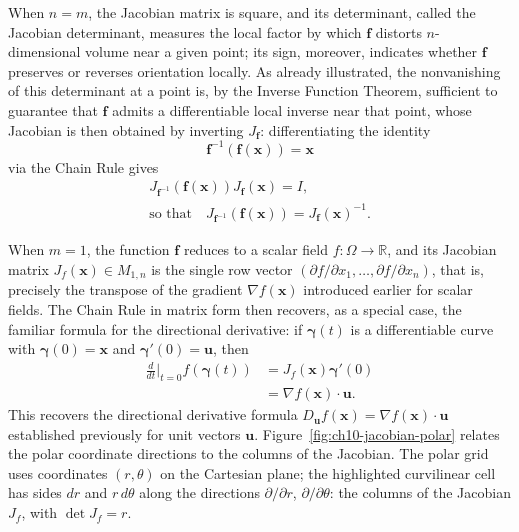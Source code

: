 When $n=m$, the Jacobian matrix is square, and its determinant, called the Jacobian determinant, measures the local factor by which $\mathbf{f}$ distorts $n$-dimensional volume near a given point; its sign, moreover, indicates whether $\mathbf{f}$ preserves or reverses orientation locally. As already illustrated, the nonvanishing of this determinant at a point is, by the Inverse Function Theorem, sufficient to guarantee that $\mathbf{f}$ admits a differentiable local inverse near that point, whose Jacobian is then obtained by inverting $J_{\mathbf{f}}$: differentiating the identity
\[
\mathbf{f}^{-1}(\mathbf{f}(\mathbf{x})) = \mathbf{x}
\]
via the Chain Rule gives
\[
\begin{gathered}
J_{\mathbf{f}^{-1}}(\mathbf{f}(\mathbf{x})) J_{\mathbf{f}}(\mathbf{x}) = I, \\[0.5em]
\text{so that}\quad J_{\mathbf{f}^{-1}}(\mathbf{f}(\mathbf{x})) = J_{\mathbf{f}}(\mathbf{x})^{-1}.
\end{gathered}
\]

When $m=1$, the function $\mathbf{f}$ reduces to a scalar field $f : \Omega \to \mathbb{R}$, and its Jacobian matrix $J_f(\mathbf{x}) \in M_{1,n}$ is the single row vector $( \partial f/\partial x_1, \dots, \partial f/\partial x_n )$, that is, precisely the transpose of the gradient $\nabla f(\mathbf{x})$ introduced earlier for scalar fields. The Chain Rule in matrix form then recovers, as a special case, the familiar formula for the directional derivative: if $\boldsymbol{\gamma}(t)$ is a differentiable curve with $\boldsymbol{\gamma}(0) = \mathbf{x}$ and $\boldsymbol{\gamma}'(0) = \mathbf{u}$, then
\[
\begin{aligned}
\frac{d}{dt}\Big|_{t=0} f(\boldsymbol{\gamma}(t)) &= J_f(\mathbf{x}) \boldsymbol{\gamma}'(0) \\[0.5em]
&= \nabla f(\mathbf{x}) \cdot \mathbf{u}.
\end{aligned}
\]
This recovers the directional derivative formula $D_{\mathbf{u}}f(\mathbf{x}) = \nabla f(\mathbf{x}) \cdot \mathbf{u}$ established previously for unit vectors $\mathbf{u}$. Figure~\ref{fig:ch10-jacobian-polar} relates the polar coordinate directions to the columns of the Jacobian. The polar grid uses coordinates $(r,\theta)$ on the Cartesian plane; the highlighted
curvilinear cell has sides $dr$ and $r\,d\theta$ along the directions $\partial/\partial r$, $\partial/\partial\theta$: the columns of the Jacobian $J_f$, with $\det J_f = r$.


